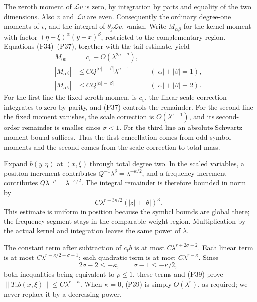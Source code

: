 \documentclass[
  11pt,
]{article}
\begin{document}
The zeroth moment of \(\mathcal L v\) is zero, by integration by parts
and equality of the two dimensions. Also \(v\) and \(\mathcal L v\) are
even. Consequently the ordinary degree-one moments of \(v\), and the
integral of \(\theta_j\mathcal L v\), vanish. Write \(M_{\alpha\beta}\)
for the kernel moment with factor \((\eta-\xi)^\alpha(y-x)^\beta\),
restricted to the complementary region. Equations (P34)--(P37), together
with the tail estimate, yield \[
 \begin{aligned}
 M_{00}&=c_v+O(\lambda^{2\sigma-2}),\\
 |M_{\alpha\beta}|&\leq C Q^{|\alpha|-|\beta|}
                         \lambda^{\sigma-1}
       &&(|\alpha|+|\beta|=1),\\
 |M_{\alpha\beta}|&\leq C Q^{|\alpha|-|\beta|}
       &&(|\alpha|+|\beta|=2).
 \end{aligned}
\tag{P38}
\] For the first line the fixed zeroth moment is \(c_v\), the linear
scale correction integrates to zero by parity, and (P37) controls the
remainder. For the second line the fixed moment vanishes, the scale
correction is \(O(\lambda^{\sigma-1})\), and its second-order remainder
is smaller since \(\sigma<1\). For the third line an absolute Schwartz
moment bound suffices. Thus the first cancellation comes from odd symbol
moments and the second comes from the scale correction to total mass.

Expand \(b(y,\eta)\) at \((x,\xi)\) through total degree two. In the
scaled variables, a position increment contributes
\(Q^{-1}\lambda^\delta=\lambda^{-\kappa/2}\), and a frequency increment
contributes \(Q\lambda^{-\rho}=\lambda^{-\kappa/2}\). The integral
remainder is therefore bounded in norm by \[
 C\lambda^{r-3\kappa/2}(|z|+|\theta|)^3.
\tag{P39}
\] This estimate is uniform in position because the symbol bounds are
global there; the frequency segment stays in the comparable-weight
region. Multiplication by the actual kernel and integration leaves the
same power of \(\lambda\).

The constant term after subtraction of \(c_vb\) is at most
\(C\lambda^{r+2\sigma-2}\). Each linear term is at most
\(C\lambda^{r-\kappa/2+\sigma-1}\); each quadratic term is at most
\(C\lambda^{r-\kappa}\). Since \[
 2\sigma-2\leq-\kappa,
 \qquad \sigma-1\leq-\kappa/2,
\tag{P40}
\] both inequalities being equivalent to \(\rho\leq1\), these terms and
(P39) prove \(\|T_vb(x,\xi)\|\leq C\lambda^{r-\kappa}\). When
\(\kappa=0\), (P39) is simply \(O(\lambda^r)\), as required; we never
replace it by a decreasing power.
\end{document}
